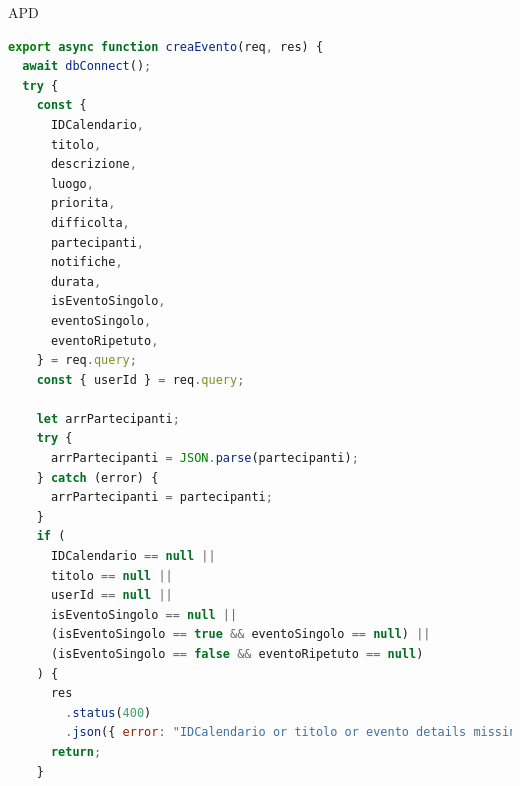 \begin{listaPersonale} {APD}
\begin{listaPersonale2}[APD]{}

                \begin{lstlisting}[language=JavaScript]
export async function creaEvento(req, res) {
  await dbConnect();
  try {
    const {
      IDCalendario,
      titolo,
      descrizione,
      luogo,
      priorita,
      difficolta,
      partecipanti,
      notifiche,
      durata,
      isEventoSingolo,
      eventoSingolo,
      eventoRipetuto,
    } = req.query;
    const { userId } = req.query;

    let arrPartecipanti;
    try {
      arrPartecipanti = JSON.parse(partecipanti);
    } catch (error) {
      arrPartecipanti = partecipanti;
    }
    if (
      IDCalendario == null ||
      titolo == null ||
      userId == null ||
      isEventoSingolo == null ||
      (isEventoSingolo == true && eventoSingolo == null) ||
      (isEventoSingolo == false && eventoRipetuto == null)
    ) {
      res
        .status(400)
        .json({ error: "IDCalendario or titolo or evento details missing" }); //TODO or userID
      return;
    }


\end{lstlisting}
\end{listaPersonale2}
\end{listaPersonale}
